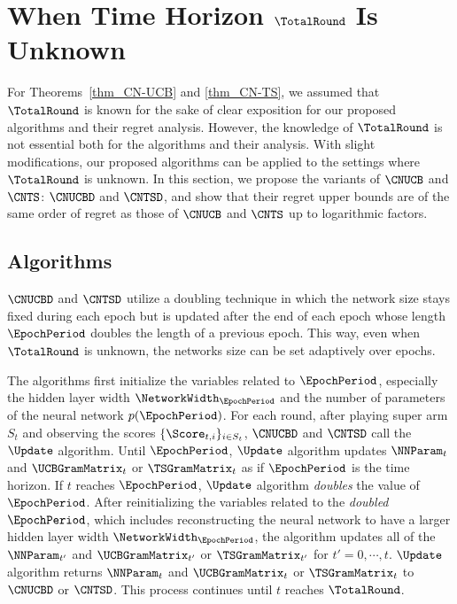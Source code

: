 \documentclass{article}
\theoremstyle{plain}
\begin{document}
\section{When Time Horizon $\TotalRound$ Is Unknown}\label{sec:unknown_T}

For Theorems~\ref{thm_CN-UCB} and \ref{thm_CN-TS}, 
we assumed that $\TotalRound$ is known for the sake of clear exposition for our proposed algorithms and their regret analysis.
However, the knowledge of $\TotalRound$ is not essential both for the algorithms and their analysis.
With slight modifications, our proposed algorithms can be applied to the settings where $\TotalRound$ is unknown.
In this section, we propose the variants of $\CNUCB$ and $\CNTS$: $\CNUCBD$ and $\CNTSD$, and show that their regret upper bounds are of the same order of regret as those of $\CNUCB$ and $\CNTS$ up to logarithmic factors.

\subsection{Algorithms}

$\CNUCBD$ and $\CNTSD$ utilize a doubling technique \cite{besson2018doubling} in which the network size stays fixed during each epoch but is updated after the end of each epoch whose length $\EpochPeriod$ doubles the length of a previous epoch.
This way, even when $\TotalRound$ is unknown, the networks size can be set adaptively over epochs.

The algorithms first initialize the variables related to $\EpochPeriod$, especially the hidden layer width $\NetworkWidth_{\EpochPeriod}$ and the number of parameters of the neural network $p(\EpochPeriod)$.
For each round, after playing super arm $S_t$ and observing the scores $\{ \Score_{t, i} \}_{i \in S_t}$,
$\CNUCBD$ and $\CNTSD$ call the $\Update$ algorithm.
Until $\EpochPeriod$, $\Update$ algorithm updates $\NNParam_{t}$ and $\UCBGramMatrix_{t}$ or $\TSGramMatrix_{t}$ as if $\EpochPeriod$ is the time horizon.
If $t$ reaches $\EpochPeriod$, $\Update$ algorithm \textit{doubles} the value of $\EpochPeriod$.
After reinitializing the variables related to the \textit{doubled} $\EpochPeriod$,
which includes reconstructing the neural network to have a larger hidden layer width $\NetworkWidth_{\EpochPeriod}$,
the algorithm updates all of the $\NNParam_{t'}$ and $\UCBGramMatrix_{t'}$ or $\TSGramMatrix_{t'}$ for $t'= 0, \cdots, t$.
    $\Update$ algorithm returns $\NNParam_{t}$ and $\UCBGramMatrix_{t}$ or $\TSGramMatrix_{t}$ to $\CNUCBD$ or $\CNTSD$.
This process continues until $t$ reaches $\TotalRound$.
\end{document}
